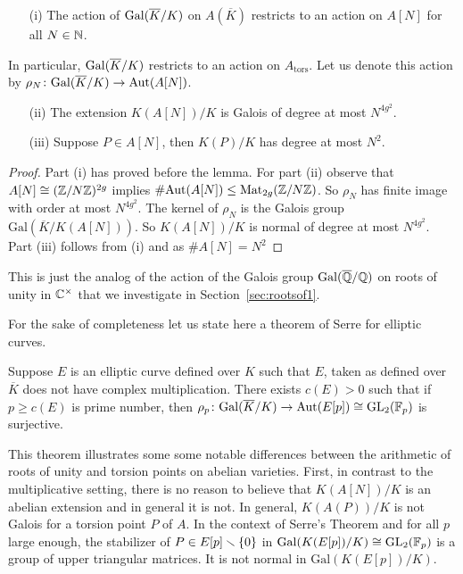 \begin{lemma}\label{lem:galoisactionav}
  \begin{enumerate}
  \item [(i)]
    The
    action of $\mathrm{Gal}(\overline{K}/K)$ on $A(\overline K)$ restricts to an action on
    $A[N]$ for all $N\in{\mathbb{N}}$.
  \end{enumerate}
  In particular, $\mathrm{Gal}(\overline{K}/K)$ restricts to
  an action on $A_{\mathrm{tors}}$. 
  Let us denote this action by
  $\rho_N\colon \mathrm{Gal}(\overline{K}/K)\rightarrow \mathrm{Aut}(A[N])$.
  \begin{enumerate}
  \item[(ii)]
    The extension $K(A[N])/K$ is Galois
    of degree at most $N^{4g^2}$.
  \item[(iii)] Suppose $P\in A[N]$, then $K(P)/K$ has degree at most
    $N^2$. 
  \end{enumerate}
\end{lemma}
\begin{proof}
  Part (i) has proved before the lemma.  For part (ii) observe that
  $A[N]\cong
  ({\mathbb{Z}}/N{\mathbb{Z}})^{2g}$ implies
  $\#\mathrm{Aut}(A[N])\le \mathrm{Mat}_{2g}({{\mathbb{Z}}/N{\mathbb{Z}}})$.
  So  $\rho_N$ has finite image with order at most $N^{4g^2}$. The kernel
  of $\rho_N$ is the Galois group $\mathrm{Gal}(\overline K/K(A[N]))$.
  So $K(A[N])/K$ is normal of degree at most $N^{4g^2}$.
  Part (iii) follows from (i) and as $\#A[N]=N^2$  
\end{proof}

This is just the analog of the action of the Galois group $\mathrm{Gal}({\overline{\mathbb{Q}}}/{\mathbb{Q}})$
on roots of unity in ${\mathbb{C}}^\times$ that we investigate in
Section~\ref{sec:rootsof1}.


For the sake of completeness let us state here a theorem of Serre for
elliptic curves.

\begin{theorem}[Serre]
  Suppose $E$ is an elliptic curve defined over $K$ such that $E$,
  taken as defined over $\overline K$ does
  not have complex multiplication. There exists $c(E)>0$ such that
  if $p\ge c(E)$ is prime number, then $\rho_p \colon
  \mathrm{Gal}(\overline{K}/K)\rightarrow \mathrm{Aut}(E[p]) \cong \mathrm{GL}_2({\mathbb{F}}_p)$
  is surjective.  
\end{theorem}

This theorem illustrates some some notable differences between the
arithmetic of roots of unity and torsion points on abelian varieties.
First, in contrast to the multiplicative setting, there is no reason
to believe that $K(A[N])/K$ is an abelian extension and in general it
is not. In general, $K(A(P))/K$ is not Galois for a torsion point $P$
of $A$. In the context of
Serre's Theorem and for all $p$ large enough, the stabilizer of $P \in
E[p] \smallsetminus\{0\}$ in $\mathrm{Gal}(K(E[p])/K)\cong \mathrm{GL}_2({\mathbb{F}}_p)$
is a group of upper triangular matrices. It is not normal in
$\mathrm{Gal}(K(E[p])/K)$.

